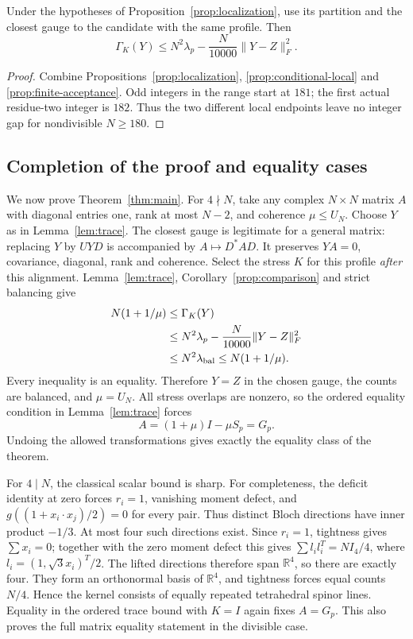 \begin{corollary}
\label{prop:comparison}
Under the hypotheses of Proposition~\ref{prop:localization}, use its
partition and the closest gauge to the candidate with the same profile.
Then
\begin{equation}\label{eq:strict-comparison}
 \Gamma_K(Y)\le N^2\lambda_p-
                  \frac{N}{10000}\|Y-Z\|_F^2.
\end{equation}
\end{corollary}
\begin{proof}
Combine Propositions~\ref{prop:localization},
\ref{prop:conditional-local} and \ref{prop:finite-acceptance}.
Odd integers in the range start at $181$; the first actual residue-two
integer is $182$. Thus the two different local endpoints leave no
integer gap for nondivisible $N\ge180$.
\end{proof}

\subsection{Completion of the proof and equality cases}
We now prove Theorem~\ref{thm:main}. For $4\nmid N$, take any complex
$N\times N$ matrix $A$ with diagonal entries one, rank at most $N-2$,
and coherence $\mu\le U_N$. Choose $Y$ as in Lemma~\ref{lem:trace}. The closest
gauge is legitimate for a general matrix: replacing $Y$ by $UYD$ is
accompanied by $A\mapsto D^*AD$. It preserves $YA=0$, covariance,
diagonal, rank and coherence. Select the stress $K$ for this profile \emph{after}
this alignment. Lemma~\ref{lem:trace}, Corollary~\ref{prop:comparison}
and strict balancing give
\[
\begin{aligned}
 N(1+1/\mu)&\le\Gamma_K(Y)\\
 &\le N^2\lambda_p-\frac N{10000}\|Y-Z\|_F^2\\
 &\le N^2\lambda_{\rm bal}\le N(1+1/\mu).
\end{aligned}
\]
Every inequality is an equality. Therefore $Y=Z$ in the chosen gauge,
the counts are balanced, and $\mu=U_N$. All stress overlaps are nonzero,
so the ordered equality condition in Lemma~\ref{lem:trace} forces
\[
 A=(1+\mu)I-\mu S_p=G_p.
\]
Undoing the allowed transformations gives exactly the equality class
of the theorem.

For $4\mid N$, the classical scalar bound is sharp. For completeness,
the deficit identity at zero forces $r_i=1$, vanishing moment defect,
and $g((1+x_i\cdot x_j)/2)=0$ for every pair. Thus distinct Bloch
directions have inner product $-1/3$. At most four such directions exist.
Since $r_i=1$, tightness gives $\sum x_i=0$; together with the zero
moment defect this gives $\sum l_il_i^T=NI_4/4$, where
$l_i=(1,\sqrt3 x_i)^T/2$. The lifted directions
therefore span $\mathbb R^4$, so there are exactly four. They form an
orthonormal basis of $\mathbb R^4$, and tightness forces equal counts
$N/4$. Hence the kernel consists of equally repeated tetrahedral spinor
lines. Equality in the ordered trace bound with $K=I$ again fixes
$A=G_p$. This also proves the full matrix equality statement in the
divisible case.

